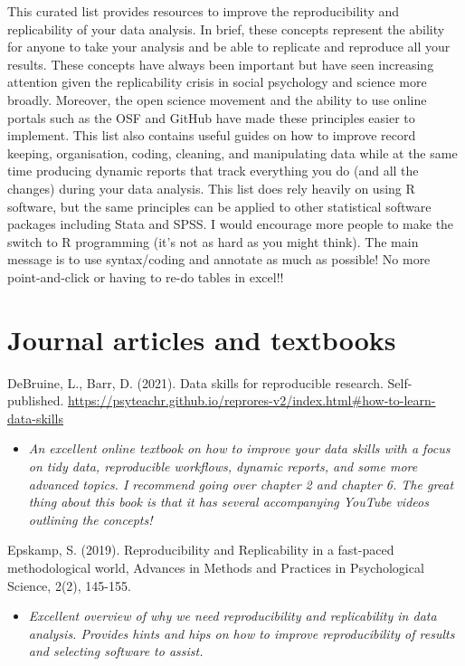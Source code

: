 \documentclass[
]{book}
\providecommand{\tightlist}{%
  \setlength{\itemsep}{0pt}\setlength{\parskip}{0pt}}
\begin{document}
This curated list provides resources to improve the reproducibility and replicability of your data analysis. In brief, these concepts represent the ability for anyone to take your analysis and be able to replicate and reproduce all your results. These concepts have always been important but have seen increasing attention given the replicability crisis in social psychology and science more broadly. Moreover, the open science movement and the ability to use online portals such as the OSF and GitHub have made these principles easier to implement. This list also contains useful guides on how to improve record keeping, organisation, coding, cleaning, and manipulating data while at the same time producing dynamic reports that track everything you do (and all the changes) during your data analysis. This list does rely heavily on using R software, but the same principles can be applied to other statistical software packages including Stata and SPSS. I would encourage more people to make the switch to R programming (it's not as hard as you might think). The main message is to use syntax/coding and annotate as much as possible! No more point-and-click or having to re-do tables in excel!!

\hypertarget{journal-articles-and-textbooks}{%
\section{Journal articles and textbooks}\label{journal-articles-and-textbooks}}

DeBruine, L., Barr, D. (2021). Data skills for reproducible research. Self-published. \url{https://psyteachr.github.io/reprores-v2/index.html\#how-to-learn-data-skills}

\begin{itemize}
\tightlist
\item
  \emph{An excellent online textbook on how to improve your data skills with a focus on tidy data, reproducible workflows, dynamic reports, and some more advanced topics. I recommend going over chapter 2 and chapter 6. The great thing about this book is that it has several accompanying YouTube videos outlining the concepts!}
\end{itemize}

Epskamp, S. (2019). Reproducibility and Replicability in a fast-paced methodological world, Advances in Methods and Practices in Psychological Science, 2(2), 145-155.

\begin{itemize}
\tightlist
\item
  \emph{Excellent overview of why we need reproducibility and replicability in data analysis. Provides hints and hips on how to improve reproducibility of results and selecting software to assist.}
\end{itemize}
\end{document}
